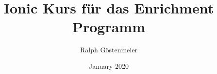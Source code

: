 \documentclass[a4paper,12pt]{book}
\begin{document}
\author{Ralph Göstenmeier}
\title{Ionic Kurs für das Enrichment Programm}
\date{January 2020}

\frontmatter
\maketitle
\tableofcontents

\mainmatter



\backmatter
\end{document}
